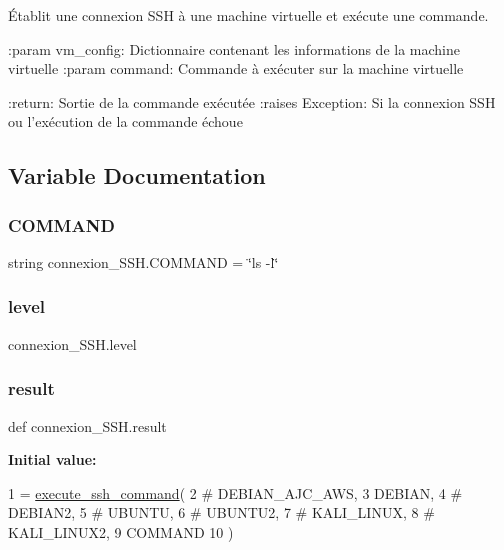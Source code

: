 \begin{DoxyVerb}Établit une connexion SSH à une machine virtuelle et exécute une commande.

:param vm_config: Dictionnaire contenant les informations de la machine virtuelle
:param command: Commande à exécuter sur la machine virtuelle

:return: Sortie de la commande exécutée
:raises Exception: Si la connexion SSH ou l'exécution de la commande échoue
\end{DoxyVerb}
 

\subsection{Variable Documentation}
\mbox{\label{namespaceconnexion__SSH_a0ca1d2768931747fc32a06533a7ed80b}} 
\subsubsection{\texorpdfstring{C\+O\+M\+M\+A\+ND}{COMMAND}}
{\footnotesize\ttfamily string connexion\+\_\+\+S\+S\+H.\+C\+O\+M\+M\+A\+ND = \char`\"{}ls -\/l\char`\"{}}

\mbox{\label{namespaceconnexion__SSH_ab87d32049db052980aa5060e990b4ce9}} 
\subsubsection{\texorpdfstring{level}{level}}
{\footnotesize\ttfamily connexion\+\_\+\+S\+S\+H.\+level}

\mbox{\label{namespaceconnexion__SSH_ab06475dbad7f16b89c9114749bc95254}} 
\subsubsection{\texorpdfstring{result}{result}}
{\footnotesize\ttfamily def connexion\+\_\+\+S\+S\+H.\+result}

{\bfseries Initial value\+:}
\begin{DoxyCode}
1 =  \hyperlink{namespaceconnexion__SSH_a301597cff046e519a69daa584f1d9166}{execute\_ssh\_command}(
2             \textcolor{comment}{# DEBIAN\_AJC\_AWS,}
3             DEBIAN,
4             \textcolor{comment}{# DEBIAN2,}
5             \textcolor{comment}{# UBUNTU,}
6             \textcolor{comment}{# UBUNTU2,}
7             \textcolor{comment}{# KALI\_LINUX,}
8             \textcolor{comment}{# KALI\_LINUX2,}
9             COMMAND
10               )
\end{DoxyCode}
